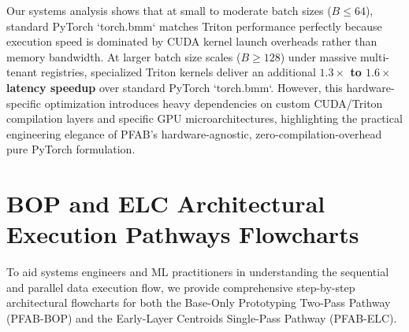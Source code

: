 \documentclass{article}
\theoremstyle{plain}
\theoremstyle{definition}
\theoremstyle{remark}
\begin{document}
Our systems analysis shows that at small to moderate batch sizes ($B \le 64$), standard PyTorch `torch.bmm` matches Triton performance perfectly because execution speed is dominated by CUDA kernel launch overheads rather than memory bandwidth. At larger batch size scales ($B \ge 128$) under massive multi-tenant registries, specialized Triton kernels deliver an additional \textbf{$1.3\times$ to $1.6\times$ latency speedup} over standard PyTorch `torch.bmm`. However, this hardware-specific optimization introduces heavy dependencies on custom CUDA/Triton compilation layers and specific GPU microarchitectures, highlighting the practical engineering elegance of \textsc{PFAB}'s hardware-agnostic, zero-compilation-overhead pure PyTorch formulation.

\section{BOP and ELC Architectural Execution Pathways Flowcharts}
\label{app:flowcharts}

To aid systems engineers and ML practitioners in understanding the sequential and parallel data execution flow, we provide comprehensive step-by-step architectural flowcharts for both the Base-Only Prototyping Two-Pass Pathway (\textsc{PFAB-BOP}) and the Early-Layer Centroids Single-Pass Pathway (\textsc{PFAB-ELC}).
\end{document}
